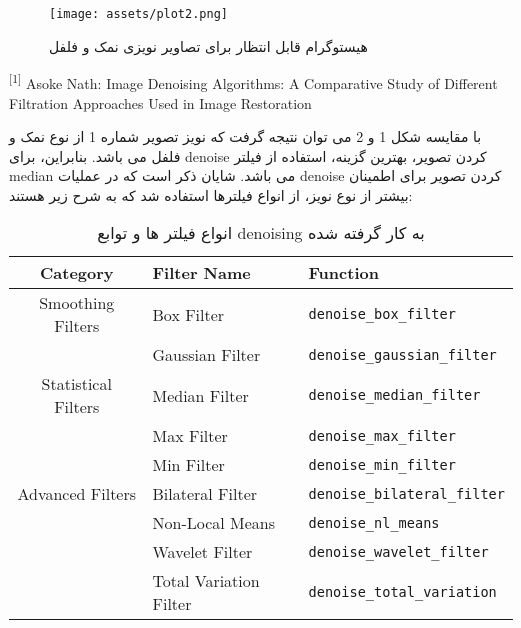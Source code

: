 \documentclass[a4paper,12pt]{article}
\begin{document}
\begin{figure}[h]
	\centering
	\texttt{[image: assets/plot2.png]}
	\caption{\textcolor{CustomAccent}{هیستوگرام قابل انتظار برای تصاویر نویزی نمک و فلفل}}
\end{figure}

\vfill
\hline
\begin{LTR}
	\begin{latin}
		\begin{center}
			\begin{minipage}{0.9\linewidth}
				\small %
				\textsuperscript{[1]} Asoke Nath: Image Denoising Algorithms: A Comparative Study of Different Filtration Approaches Used in Image Restoration
			\end{minipage}
		\end{center}
	\end{latin}
\end{LTR}

با مقایسه شکل 1 و 2 می توان نتیجه گرفت که نویز تصویر شماره 1 از نوع نمک و فلفل می باشد. بنابراین، برای denoise کردن تصویر، بهترین گزینه، استفاده از فیلتر median می باشد. 
شایان ذکر است که در عملیات denoise کردن تصویر برای اطمینان بیشتر از نوع نویز، از انواع فیلترها استفاده شد که به شرح زیر هستند:

\begin{table}[ht]
	\centering
	\begin{latin}
	\begin{tabular}{|c|l|l|}
		\hline
		\textbf{Category} & \textbf{Filter Name} & \textbf{Function} \\
		\hline
		Smoothing Filters  & Box Filter              & \texttt{denoise\_box\_filter} \\
		& Gaussian Filter         & \texttt{denoise\_gaussian\_filter} \\
		\hline
		Statistical Filters & Median Filter           & \texttt{denoise\_median\_filter} \\
		& Max Filter              & \texttt{denoise\_max\_filter} \\
		& Min Filter              & \texttt{denoise\_min\_filter} \\
		\hline
		Advanced Filters   & Bilateral Filter        & \texttt{denoise\_bilateral\_filter} \\
		& Non-Local Means         & \texttt{denoise\_nl\_means} \\
		& Wavelet Filter          & \texttt{denoise\_wavelet\_filter} \\
		& Total Variation Filter  & \texttt{denoise\_total\_variation} \\
		\hline
	\end{tabular}
	\end{latin}
	\caption{انواع فیلتر ها و توابع denoising به کار گرفته شده}
\end{table}
\end{document}
